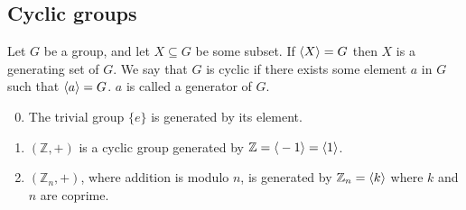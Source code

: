 \subsection{Cyclic groups}
\begin{definition}
	Let \(G\) be a group, and let \(X \subseteq G\) be some subset.
	If \(\langle{} X \rangle = G\) then \(X\) is a generating set of \(G\).
	We say that \(G\) is cyclic if there exists some element \(a\) in \(G\) such that \(\langle{} a \rangle = G\).
	\(a\) is called a generator of \(G\).
\end{definition}
\begin{enumerate}
	\setcounter{enumi}{-1}
	\item The trivial group \(\{ e \}\) is generated by its element.
	\item \((\mathbb Z, +)\) is a cyclic group generated by \(\mathbb Z = \langle{} -1 \rangle = \langle{} 1 \rangle\).
	\item \((\mathbb Z_n, +)\), where addition is modulo \(n\), is generated by \(\mathbb Z_n = \langle{} k \rangle\) where \(k\) and \(n\) are coprime.
\end{enumerate}
